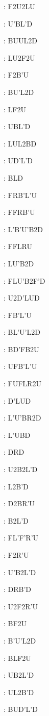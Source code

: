 \documentclass[9pt]{article}
\begin{document}
{\begin{multicols}{6}
: F2U2LU

: U'BL'D

: BUUL2D

: LU2F2U

: F2B'U

: BU'L2D

: LF2U

: UBL'D

: LUL2BD

: UD'L'D

: BLD

: FRB'L'U

: FFRB'U

: L'B'U'B2D

: FFLRU

: LU'B2D

: FLU'B2F'D

: U2D'LUD

: FB'L'U

: BL'U'L2D

: BD'FB2U

: UFB'L'U

: FUFLR2U

: D'LUD

: L'U'BR2D

: L'UBD

: DRD

: U2B2L'D

: L2B'D

: D2BR'U

: B2L'D

: FL'F'R'U

: F2R'U

: U'B2L'D

: DRB'D

: U2F2R'U

: BF2U

: B'U'L2D

: BLF2U

: UB2L'D

: UL2B'D

: BUD'L'D


\end{multicols}}
\end{document}
